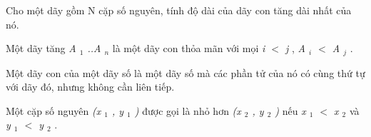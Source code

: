 Cho một dãy gồm       N      cặp số nguyên, tính độ dài của       dãy con tăng dài nhất      của nó.  

   Một       dãy tăng      \textit{    A    $_     1    $    ..A    $_     n    $}   là một dãy con thỏa mãn với mọi   \textit{    i $<$ j   }   ,   \textit{    A    $_     i    $    $<$ A    $_     j    $}   .  

   Một       dãy con      của một dãy số là một dãy số mà các phần tử của nó có cùng thứ tự với dãy đó, nhưng không cần liên tiếp.  

   Một cặp số nguyên   \textit{    (x    $_     1    $    , y    $_     1    $    )   }   được gọi là nhỏ hơn   \textit{    (x    $_     2    $    , y    $_     2    $    )   }       nếu      \textit{    x    $_     1    $    $<$ x    $_     2    $}   và   \textit{    y    $_     1    $    $<$ y    $_     2    $}   .  

\
